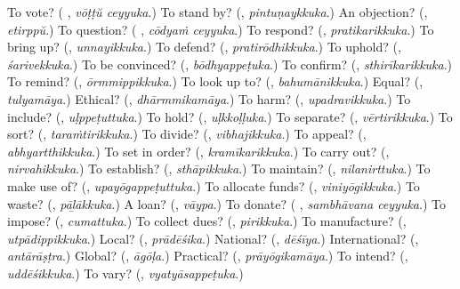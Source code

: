 \begin{tcolorbox}[breakable,colback=teal!4,colframe=teal!35!black,title={Before you move on}]
To vote? (\textbf{ }, \emph{vōṭṭŭ ceyyuka}.) To stand by? (\textbf{}, \emph{pintuṇaykkuka}.) An objection? (\textbf{}, \emph{etirppŭ}.) To question? (\textbf{ }, \emph{cōdyaṁ ceyyuka}.) To respond? (\textbf{}, \emph{pratikarikkuka}.) To bring up? (\textbf{}, \emph{unnayikkuka}.) To defend? (\textbf{}, \emph{pratirōdhikkuka}.) To uphold? (\textbf{}, \emph{śarivekkuka}.) To be convinced? (\textbf{}, \emph{bōdhyappeṭuka}.) To confirm? (\textbf{}, \emph{sthirīkarikkuka}.) To remind? (\textbf{}, \emph{ōrmmippikkuka}.) To look up to? (\textbf{}, \emph{bahumānikkuka}.) Equal? (\textbf{}, \emph{tulyamāya}.) Ethical? (\textbf{}, \emph{dhārmmikamāya}.) To harm? (\textbf{}, \emph{upadravikkuka}.) To include? (\textbf{}, \emph{uḷppeṭuttuka}.) To hold? (\textbf{}, \emph{uḷkkoḷḷuka}.) To separate? (\textbf{}, \emph{vērtirikkuka}.) To sort? (\textbf{}, \emph{taraṁtirikkuka}.) To divide? (\textbf{}, \emph{vibhajikkuka}.) To appeal? (\textbf{}, \emph{abhyartthikkuka}.) To set in order? (\textbf{}, \emph{kramīkarikkuka}.) To carry out? (\textbf{}, \emph{nirvahikkuka}.) To establish? (\textbf{}, \emph{sthāpikkuka}.) To maintain? (\textbf{}, \emph{nilanirttuka}.) To make use of? (\textbf{}, \emph{upayōgappeṭuttuka}.) To allocate funds? (\textbf{}, \emph{viniyōgikkuka}.) To waste? (\textbf{}, \emph{pāḻākkuka}.) A loan? (\textbf{}, \emph{vāypa}.) To donate? (\textbf{ }, \emph{sambhāvana ceyyuka}.) To impose? (\textbf{}, \emph{cumattuka}.) To collect dues? (\textbf{}, \emph{pirikkuka}.) To manufacture? (\textbf{}, \emph{utpādippikkuka}.) Local? (\textbf{}, \emph{prādēśika}.) National? (\textbf{}, \emph{dēśīya}.) International? (\textbf{}, \emph{antārāṣṭra}.) Global? (\textbf{}, \emph{āgōḷa}.) Practical? (\textbf{}, \emph{prāyōgikamāya}.) To intend? (\textbf{}, \emph{uddēśikkuka}.) To vary? (\textbf{}, \emph{vyatyāsappeṭuka}.)
\end{tcolorbox}
